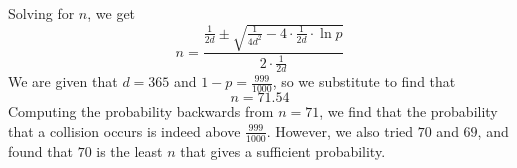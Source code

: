 \documentclass[11pt]{article}
\begin{document}
%
Solving for $n$, we get
%
\begin{equation*}
    n
    = \frac{
        \frac{1}{2d}
        \pm
        \sqrt{
            \frac{1}{4d^2} - 4 \cdot \frac{1}{2d} \cdot \ln p
        }
    }{
        2 \cdot \frac{1}{2d}
    }
\end{equation*}
%
We are given that $d = 365$ and $1 - p = \frac{999}{1000}$, so we substitute to
find that
%
\begin{equation*}
    n = 71.54
\end{equation*}
%
Computing the probability backwards from $n = 71$, we find that the probability
that a collision occurs is indeed above $\frac{999}{1000}$. However, we also
tried $70$ and $69$, and found that $70$ is the least $n$ that gives a
sufficient probability.
\end{document}
